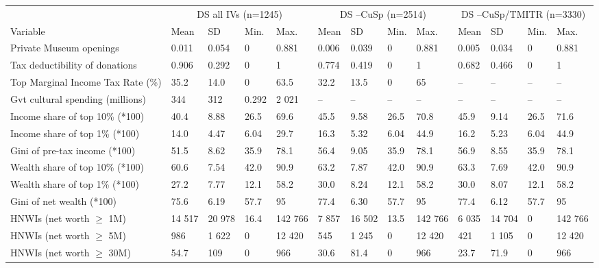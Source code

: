 \documentclass[11pt]{article}
\begin{document}
\begin{landscape}
\begin{table}[ht]
\centering
\begin{tabular}{p{7cm}llllllllllll}
  \hline 
  & \multicolumn{4}{c}{DS all IVs (n=1245)} & \multicolumn{4}{c}{DS --CuSp (n=2514)} & \multicolumn{4}{c}{DS --CuSp/TMITR (n=3330)} \\ 
\cmidrule(r){2-5}\cmidrule(r){6-9}\cmidrule(r){10-13}  
 Variable & Mean & SD & Min. & Max. & Mean & SD & Min. & Max. & Mean & SD & Min. & Max. \\ 
  \hline
Private Museum openings & 0.011 & 0.054 & 0 & 0.881 & 0.006 & 0.039 & 0 & 0.881 & 0.005 & 0.034 & 0 & 0.881 \\ 
  Tax deductibility of donations & 0.906 & 0.292 & 0 & 1 & 0.774 & 0.419 & 0 & 1 & 0.682 & 0.466 & 0 & 1 \\ 
  Top Marginal Income Tax Rate (\%) & 35.2 & 14.0 & 0 & 63.5 & 32.2 & 13.5 & 0 & 65 & -- & -- & -- & -- \\ 
  Gvt cultural spending (millions) & 344 & 312 & 0.292 & 2 021 & -- & -- & -- & -- & -- & -- & -- & -- \\ 
  Income share of top 10\% (*100) & 40.4 & 8.88 & 26.5 & 69.6 & 45.5 & 9.58 & 26.5 & 70.8 & 45.9 & 9.14 & 26.5 & 71.6 \\ 
  Income share of top 1\% (*100) & 14.0 & 4.47 & 6.04 & 29.7 & 16.3 & 5.32 & 6.04 & 44.9 & 16.2 & 5.23 & 6.04 & 44.9 \\ 
  Gini of pre-tax income (*100) & 51.5 & 8.62 & 35.9 & 78.1 & 56.4 & 9.05 & 35.9 & 78.1 & 56.9 & 8.55 & 35.9 & 78.1 \\ 
  Wealth share of top 10\% (*100) & 60.6 & 7.54 & 42.0 & 90.9 & 63.2 & 7.87 & 42.0 & 90.9 & 63.3 & 7.69 & 42.0 & 90.9 \\ 
  Wealth share of top 1\% (*100) & 27.2 & 7.77 & 12.1 & 58.2 & 30.0 & 8.24 & 12.1 & 58.2 & 30.0 & 8.07 & 12.1 & 58.2 \\ 
  Gini of net wealth (*100) & 75.6 & 6.19 & 57.7 & 95 & 77.4 & 6.30 & 57.7 & 95 & 77.4 & 6.12 & 57.7 & 95 \\ 
  HNWIs (net worth $\geq$ 1M) & 14 517 & 20 978 & 16.4 & 142 766 & 7 857 & 16 502 & 13.5 & 142 766 & 6 035 & 14 704 & 0 & 142 766 \\ 
  HNWIs (net worth $\geq$ 5M) & 986 & 1 622 & 0 & 12 420 & 545 & 1 245 & 0 & 12 420 & 421 & 1 105 & 0 & 12 420 \\ 
  HNWIs (net worth $\geq$ 30M) & 54.7 & 109 & 0 & 966 & 30.6 & 81.4 & 0 & 966 & 23.7 & 71.9 & 0 & 966 \\ 

\end{tabular}
\end{table}
\end{landscape}
\end{document}
